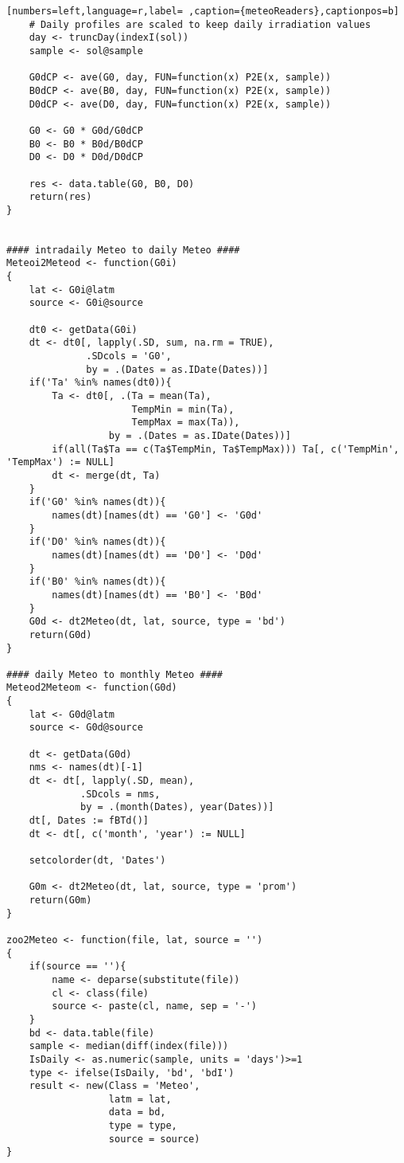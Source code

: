 \begin{lstlisting}[numbers=left,language=r,label= ,caption={meteoReaders},captionpos=b]
    # Daily profiles are scaled to keep daily irradiation values
    day <- truncDay(indexI(sol))
    sample <- sol@sample

    G0dCP <- ave(G0, day, FUN=function(x) P2E(x, sample))
    B0dCP <- ave(B0, day, FUN=function(x) P2E(x, sample))
    D0dCP <- ave(D0, day, FUN=function(x) P2E(x, sample))

    G0 <- G0 * G0d/G0dCP
    B0 <- B0 * B0d/B0dCP
    D0 <- D0 * D0d/D0dCP

    res <- data.table(G0, B0, D0)
    return(res)
}


#### intradaily Meteo to daily Meteo ####
Meteoi2Meteod <- function(G0i)
{
    lat <- G0i@latm
    source <- G0i@source

    dt0 <- getData(G0i)
    dt <- dt0[, lapply(.SD, sum, na.rm = TRUE),
              .SDcols = 'G0',
              by = .(Dates = as.IDate(Dates))]
    if('Ta' %in% names(dt0)){
        Ta <- dt0[, .(Ta = mean(Ta),
                      TempMin = min(Ta),
                      TempMax = max(Ta)),
                  by = .(Dates = as.IDate(Dates))]
        if(all(Ta$Ta == c(Ta$TempMin, Ta$TempMax))) Ta[, c('TempMin', 'TempMax') := NULL]
        dt <- merge(dt, Ta)
    }
    if('G0' %in% names(dt)){
        names(dt)[names(dt) == 'G0'] <- 'G0d'
    }
    if('D0' %in% names(dt)){
        names(dt)[names(dt) == 'D0'] <- 'D0d'
    }
    if('B0' %in% names(dt)){
        names(dt)[names(dt) == 'B0'] <- 'B0d'
    }
    G0d <- dt2Meteo(dt, lat, source, type = 'bd')
    return(G0d)
}

#### daily Meteo to monthly Meteo ####
Meteod2Meteom <- function(G0d)
{
    lat <- G0d@latm
    source <- G0d@source

    dt <- getData(G0d)
    nms <- names(dt)[-1]
    dt <- dt[, lapply(.SD, mean),
             .SDcols = nms,
             by = .(month(Dates), year(Dates))]
    dt[, Dates := fBTd()]
    dt <- dt[, c('month', 'year') := NULL]

    setcolorder(dt, 'Dates')

    G0m <- dt2Meteo(dt, lat, source, type = 'prom')
    return(G0m)
}

zoo2Meteo <- function(file, lat, source = '')
{
    if(source == ''){
        name <- deparse(substitute(file))
        cl <- class(file)
        source <- paste(cl, name, sep = '-')
    }
    bd <- data.table(file)
    sample <- median(diff(index(file)))
    IsDaily <- as.numeric(sample, units = 'days')>=1
    type <- ifelse(IsDaily, 'bd', 'bdI')
    result <- new(Class = 'Meteo',
                  latm = lat,
                  data = bd,
                  type = type,
                  source = source)
}


\end{lstlisting}
